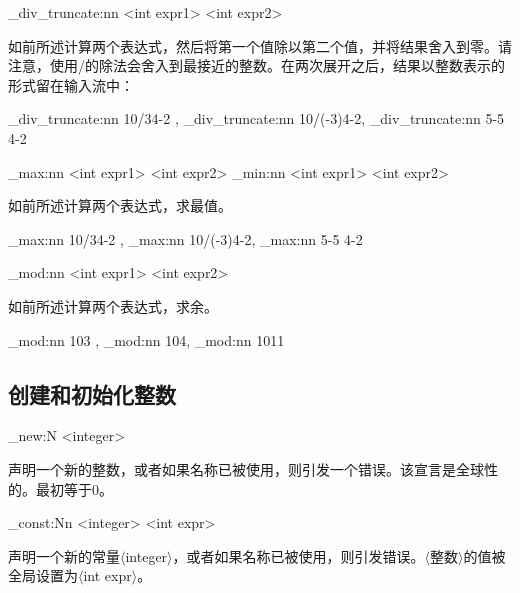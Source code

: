 \begin{my}
	\int_div_truncate:nn {<int expr1>} {<int expr2>}
\end{my}

如前所述计算两个表达式，然后将第一个值除以第二个值，并将结果舍入到零。请注意，使用/的除法会舍入到最接近的整数。在两次展开之后，结果以整数表示的形式留在输入流中：

\begin{examplee}			
	\ExplSyntaxOn		
	\int_div_truncate:nn {10/3}{4-2} ,
	\int_div_truncate:nn {10/(-3)}{4-2},
	\int_div_truncate:nn {5-5}	{4-2}
	\ExplSyntaxOff
\end{examplee}	

\begin{my}
	\int_max:nn {<int expr1>} {<int expr2>}
	\int_min:nn {<int expr1>} {<int expr2>}
\end{my}

如前所述计算两个表达式，求最值。

\begin{examplee}			
	\ExplSyntaxOn		
	\int_max:nn {10/3}{4-2} ,
	\int_max:nn {10/(-3)}{4-2},
	\int_max:nn {5-5}	{4-2}
	\ExplSyntaxOff
\end{examplee}

\begin{my}
	\int_mod:nn {<int expr1>} {<int expr2>}
\end{my}

如前所述计算两个表达式，求余。

\begin{examplee}			
	\ExplSyntaxOn		
	\int_mod:nn {10}{3} ,
	\int_mod:nn {10}{4},
	\int_mod:nn {10}{11}
	\ExplSyntaxOff
\end{examplee}

\subsection{创建和初始化整数}

\begin{my}
	\int_new:N <integer>
\end{my}

声明一个新的整数，或者如果名称已被使用，则引发一个错误。该宣言是全球性的。最初等于0。

\begin{my}
	\int_const:Nn <integer> {<int expr>}
\end{my}

声明一个新的常量$\langle$integer$\rangle$，或者如果名称已被使用，则引发错误。$\langle$整数$\rangle$的值被全局设置为$\langle$int expr$\rangle$。

